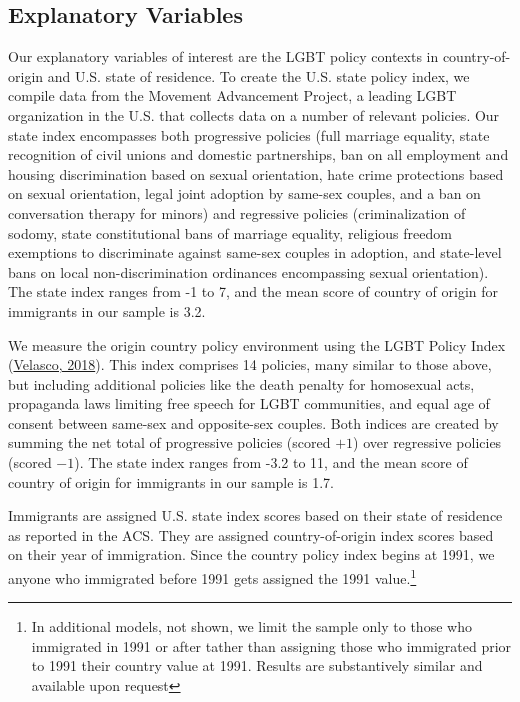 \documentclass[
  11pt,
]{article}
\begin{document}
\hypertarget{explanatory-variables}{%
\subsection{Explanatory Variables}\label{explanatory-variables}}

Our explanatory variables of interest are the LGBT policy contexts in country-of-origin and U.S. state of residence. To create the U.S. state policy index, we compile data from the Movement Advancement Project, a leading LGBT organization in the U.S. that collects data on a number of relevant policies. Our state index encompasses both progressive policies (full marriage equality, state recognition of civil unions and domestic partnerships, ban on all employment and housing discrimination based on sexual orientation, hate crime protections based on sexual orientation, legal joint adoption by same-sex couples, and a ban on conversation therapy for minors) and regressive policies (criminalization of sodomy, state constitutional bans of marriage equality, religious freedom exemptions to discriminate against same-sex couples in adoption, and state-level bans on local non-discrimination ordinances encompassing sexual orientation). The state index ranges from -1 to 7, and the mean score of country of origin for immigrants in our sample is 3.2.

We measure the origin country policy environment using the LGBT Policy Index (\protect\hyperlink{ref-velasco_2018}{Velasco, 2018}). This index comprises 14 policies, many similar to those above, but including additional policies like the death penalty for homosexual acts, propaganda laws limiting free speech for LGBT communities, and equal age of consent between same-sex and opposite-sex couples. Both indices are created by summing the net total of progressive policies (scored \(+1\)) over regressive policies (scored \(-1\)). The state index ranges from -3.2 to 11, and the mean score of country of origin for immigrants in our sample is 1.7.

Immigrants are assigned U.S. state index scores based on their state of residence as reported in the ACS. They are assigned country-of-origin index scores based on their year of immigration. Since the country policy index begins at 1991, we anyone who immigrated before 1991 gets assigned the 1991 value.\footnote{In additional models, not shown, we limit the sample only to those who immigrated in 1991 or after tather than assigning those who immigrated prior to 1991 their country value at 1991. Results are substantively similar and available upon request}
\end{document}
